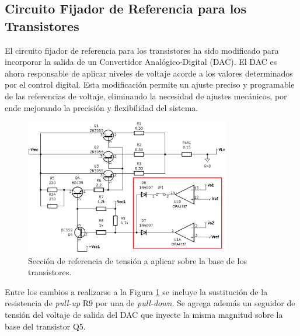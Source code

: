 \subsection{Circuito Fijador de Referencia para los Transistores}
El circuito fijador de referencia para los transistores ha sido modificado para incorporar la salida de un Convertidor Analógico-Digital (DAC). El DAC es ahora responsable de aplicar niveles de voltaje acorde a los valores determinados por el control digital. Esta modificación permite un ajuste preciso y programable de las referencias de voltaje, eliminando la necesidad de ajustes mecánicos, por ende mejorando la precisión y flexibilidad del sistema.
\begin{figure}[H]
    \centering
    \includegraphics[width=0.8\textwidth]{./imagenes/Eliminada1.PNG}
    \caption{Sección de referencia de tensión a aplicar sobre la base de los transistores.}
    \label{F:Eliminada1}
\end{figure}\par 
Entre los cambios a realizarse a la Figura \ref{F:Eliminada1} se incluye la sustitución de la resistencia de \textit{pull-up} R9 por una de \textit{pull-down}. Se agrega además un seguidor de tensión del voltaje de salida del DAC que inyecte la misma magnitud sobre la base del transistor Q5.

